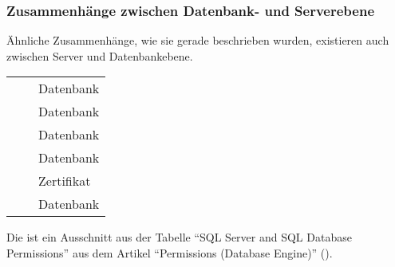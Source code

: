         \subsubsection{Zusammenhänge zwischen Datenbank- und Serverebene}
          Ähnliche Zusammenhänge, wie sie gerade beschrieben wurden, existieren
          auch zwischen Server und Datenbankebene.
           \begin{center}
            \begin{small}
              \label{tabserverpermimplicit}
              \tablehead{}
              \tabletail{
              }
              \tablelasttail{
              }
              \begin{supertabular}{l|l|l}
                 &  & Datenbank \\
                 &  & Datenbank \\
                 &  & Datenbank \\
                 &  & Datenbank \\
                 &  & Zertifikat \\
                 &  & Datenbank \\
              \end{supertabular}
            \end{small}
          \end{center}
          Die  ist ein Ausschnitt aus der
          Tabelle \enquote{SQL Server and SQL Database Permissions} aus dem
          Artikel \enquote{Permissions (Database Engine)}
          (\parencite{ms191291}).
          \begin{literaturinternet}
            \item \cite{ms190401}
            \item \cite{ms175536}
            \item \cite{ms191291}
          \end{literaturinternet}
